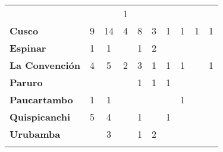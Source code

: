 \begin{tabular}{lccccccccc}
	&\cellcolor[HTML]{FCC46C}					&\cellcolor[HTML]{FCC46C}
	&1											&\cellcolor[HTML]{FCC46C}\\
	\textbf{Cusco}                            										
	&9 	
	&14 										&4
	&8											&3
	&1											&1
	&1											&1\\
	\textbf{Espinar}       					             								
	&1											&1
	&\cellcolor[HTML]{FCC46C}					&1
	&2											&\cellcolor[HTML]{FCC46C}	
	&\cellcolor[HTML]{FCC46C} 					&\cellcolor[HTML]{FCC46C}
	&\cellcolor[HTML]{FCC46C}\\
	\textbf{La Convención}                      					
	&4											&5
	&2											&3
	&1 											&1 
	&1											&\cellcolor[HTML]{FCC46C}
	&1\\
	\textbf{Paruro}                            					
	&\cellcolor[HTML]{FCC46C}					&\cellcolor[HTML]{FCC46C}
	&\cellcolor[HTML]{FCC46C} 					&1
	&1											&1
	&\cellcolor[HTML]{FCC46C}					&\cellcolor[HTML]{FCC46C}
	&\cellcolor[HTML]{FCC46C}\\
	\textbf{Paucartambo}               		                       					
												&1		
	&1											&\cellcolor[HTML]{FCC46C}
	&\cellcolor[HTML]{FCC46C}
	&\cellcolor[HTML]{FCC46C}					&\cellcolor[HTML]{FCC46C}
	&1											&\cellcolor[HTML]{FCC46C}
	&\cellcolor[HTML]{FCC46C}\\
	\textbf{Quispicanchi}                                         	                 	
												&5
	&4											&\cellcolor[HTML]{FCC46C}
	&1											&\cellcolor[HTML]{FCC46C}
	&1											&\cellcolor[HTML]{FCC46C}
	&\cellcolor[HTML]{FCC46C}					&\cellcolor[HTML]{FCC46C}\\
	\textbf{Urubamba}                                                          			
	&\cellcolor[HTML]{FCC46C}					&3
	&\cellcolor[HTML]{FCC46C}					&1
	&2											&\cellcolor[HTML]{FCC46C}
	&\cellcolor[HTML]{FCC46C}					&\cellcolor[HTML]{FCC46C}
	&\cellcolor[HTML]{FCC46C} \\	
	&\multicolumn{1}{l}{}                       &\multicolumn{1}{l}{}            &\multicolumn{1}{l}{}                         
	&\multicolumn{1}{l}{}                       &\multicolumn{1}{l}{}            &\multicolumn{1}{l}{}                       &\multicolumn{1}{l}{}                       &\multicolumn{1}{l}{}            &\multicolumn{1}{l}{}    
\end{tabular}